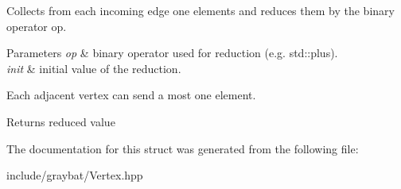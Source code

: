 Collects from each incoming edge one elements and reduces them by the binary operator op. 


\begin{DoxyParams}{Parameters}
{\em op} & binary operator used for reduction (e.\+g. std\+::plus). \\
\hline
{\em init} & initial value of the reduction.\\
\hline
\end{DoxyParams}
Each adjacent vertex can send a most one element.

\begin{DoxyReturn}{Returns}
reduced value 
\end{DoxyReturn}


The documentation for this struct was generated from the following file\+:\begin{DoxyCompactItemize}
\item 
include/graybat/Vertex.\+hpp\end{DoxyCompactItemize}
